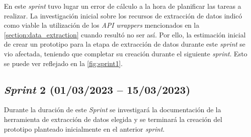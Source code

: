 En este \textit{sprint} tuvo lugar un error de cálculo a la hora de planificar las tareas a realizar. La investigación inicial sobre los recursos de extracción de datos indicó como viable la utilización de los \textit{API wrappers} mencionados en la \autoref{section:data_extraction} cuando resultó no ser así. Por ello, la estimación inicial de crear un prototipo para la etapa de extracción de datos durante este \textit{sprint} se vio afectada, teniendo que completar su creación durante el siguiente \textit{sprint}. Esto se puede ver reflejado en la \autoref{fig:sprint1}.


\subsection{\textit{Sprint} 2 (01/03/2023 -- 15/03/2023)}

Durante la duración de este \textit{Sprint} se investigará la documentación de la herramienta de extracción de datos elegida y se terminará la creación del prototipo planteado inicialmente en el anterior \textit{sprint}.

